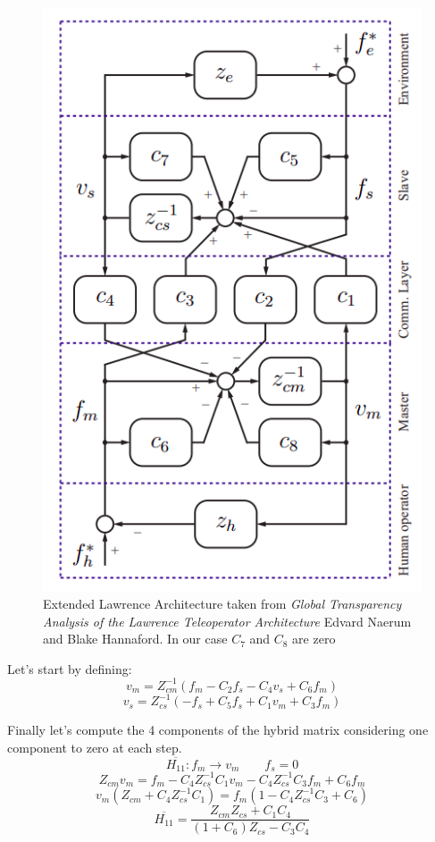 \documentclass[a4paper,12pt]{article}
\begin{document}
\begin{figure}[H]
    \begin{center}
        \includegraphics[scale=0.4]{images/teleop.png}
    \end{center}
    \caption{Extended Lawrence Architecture taken from \textit{Global Transparency Analysis of the Lawrence Teleoperator Architecture} Edvard Naerum and Blake Hannaford. In our case $C_7$ and $C_8$ are zero}
    \label{fig:hw3_vel}
\end{figure}

\noindent Let's start by defining:
\begin{equation}
    v_m = Z_{cm}^{-1}(f_m -C_2f_s-C_4v_s+C_6f_m)
\end{equation}
\begin{equation}
    v_s = Z_{cs}^{-1}(-f_s +C_5f_s+C_1v_m+C_3f_m)
\end{equation}

\noindent Finally let's compute the 4 components of the hybrid matrix considering one component to zero at each step.
\[
    \overline{H_{11}} : f_m \rightarrow v_m \qquad f_s = 0
    \]\[
    Z_{cm}v_m = f_m - C_4Z_{cs}^{-1}C_1v_m - C_4Z_{cs}^{-1}C_3f_m + C_6f_m
\]\[
    v_m(Z_{cm}+C_4Z_{cs}^{-1}C_1) = f_m(1-C_4Z_{cs}^{-1}C_3 + C_6)
    \]\[
    \overline{H_{11}} = \frac{Z_{cm}Z_{cs}+C_1C_4}{(1+C_6)Z_{cs} - C_3C_4}
\]
\end{document}

